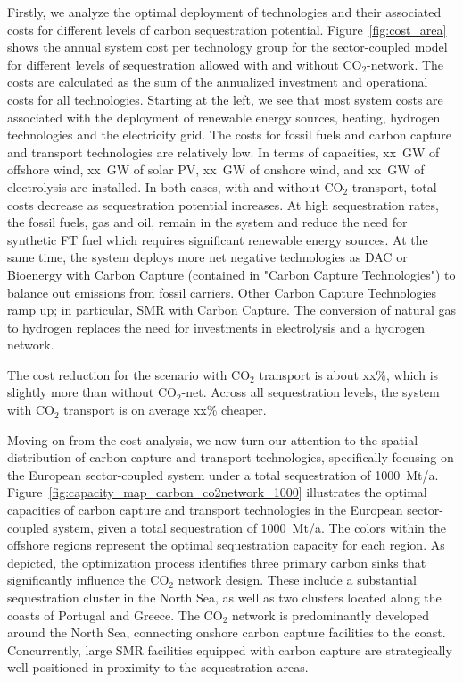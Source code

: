 \documentclass[conference]{IEEEtran}
\begin{document}
Firstly, we analyze the optimal deployment of technologies and their associated costs for different levels of carbon sequestration potential.
Figure~\ref{fig:cost_area} shows the annual system cost per technology group for the sector-coupled model for different levels of sequestration allowed with and without CO$_2$-network. The costs are calculated as the sum of the annualized investment and operational costs for all technologies. Starting at the left, we see that most system costs are associated with the deployment of renewable energy sources, heating, hydrogen technologies and the electricity grid. The costs for fossil fuels and carbon capture and transport technologies are relatively low. In terms of capacities, xx~GW of offshore wind, xx~GW of solar PV, xx~GW of onshore wind, and xx~GW of electrolysis are installed.
In both cases, with and without CO$_2$ transport, total costs decrease as sequestration potential increases. At high sequestration rates, the fossil fuels, gas and oil, remain in the system and reduce the need for synthetic FT fuel which requires significant renewable energy sources. At the same time, the system deploys more net negative technologies as DAC or Bioenergy with Carbon Capture (contained in "Carbon Capture Technologies") to balance out emissions from fossil carriers. Other Carbon Capture Technologies ramp up; in particular, SMR with Carbon Capture. The conversion of natural gas to hydrogen replaces the need for investments in electrolysis and a hydrogen network.

The cost reduction for the scenario with CO$_2$ transport is about xx\%, which is slightly more than without CO$_2$-net. Across all sequestration levels, the system with CO$_2$ transport is on average xx\% cheaper.


Moving on from the cost analysis, we now turn our attention to the spatial distribution of carbon capture and transport technologies, specifically focusing on the European sector-coupled system under a total sequestration of 1000~Mt/a.
Figure~\ref{fig:capacity_map_carbon_co2network_1000} illustrates the optimal capacities of carbon capture and transport technologies in the European sector-coupled system, given a total sequestration of 1000~Mt/a. The colors within the offshore regions represent the optimal sequestration capacity for each region. As depicted, the optimization process identifies three primary carbon sinks that significantly influence the CO$_2$ network design. These include a substantial sequestration cluster in the North Sea, as well as two clusters located along the coasts of Portugal and Greece. The CO$_2$ network is predominantly developed around the North Sea, connecting onshore carbon capture facilities to the coast. Concurrently, large SMR facilities equipped with carbon capture are strategically well-positioned in proximity to the sequestration areas.
\end{document}
